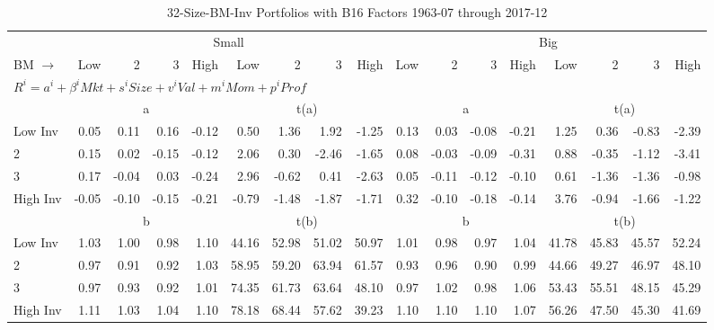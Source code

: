 
\begin{table}[!ht]
\footnotesize
\centering
\caption{32-Size-BM-Inv Portfolios with B16 Factors 1963-07 through 2017-12}
\begin{tabular}{lrrrrrrrrrrrrrrrr}
  \toprule
     & \multicolumn{8}{c}{Small} & \multicolumn{8}{c}{Big}  \\
     \cmidrule(r){2-9} \cmidrule(r){10-17}
    BM $\rightarrow$ & Low & 2 & 3 & High & Low & 2 & 3 & High & Low & 2 & 3 & High & Low & 2 & 3 & High  \\ 
  \midrule
  \multicolumn{17}{l}{$R^i=a^i+\beta^iMkt+s^iSize+v^iVal+m^iMom+p^iProf$}  \\
  
     & \multicolumn{4}{c}{a} & \multicolumn{4}{c}{t(a)}  & \multicolumn{4}{c}{a} & \multicolumn{4}{c}{t(a)}   \\
     \cmidrule(r){2-5} \cmidrule(r){6-9}  \cmidrule(r){10-13} \cmidrule(r){14-17} 
    Low Inv  & 0.05  & 0.11  & 0.16  & -0.12  & 0.50  & 1.36  & 1.92  & -1.25  & 0.13  & 0.03  & -0.08  & -0.21  & 1.25  & 0.36  & -0.83  & -2.39   \\
    2  & 0.15  & 0.02  & -0.15  & -0.12  & 2.06  & 0.30  & -2.46  & -1.65  & 0.08  & -0.03  & -0.09  & -0.31  & 0.88  & -0.35  & -1.12  & -3.41   \\
    3  & 0.17  & -0.04  & 0.03  & -0.24  & 2.96  & -0.62  & 0.41  & -2.63  & 0.05  & -0.11  & -0.12  & -0.10  & 0.61  & -1.36  & -1.36  & -0.98   \\
    High Inv  & -0.05  & -0.10  & -0.15  & -0.21  & -0.79  & -1.48  & -1.87  & -1.71  & 0.32  & -0.10  & -0.18  & -0.14  & 3.76  & -0.94  & -1.66  & -1.22   \\
    
  
     & \multicolumn{4}{c}{b} & \multicolumn{4}{c}{t(b)}  & \multicolumn{4}{c}{b} & \multicolumn{4}{c}{t(b)}   \\
     \cmidrule(r){2-5} \cmidrule(r){6-9}  \cmidrule(r){10-13} \cmidrule(r){14-17} 
    Low Inv  & 1.03  & 1.00  & 0.98  & 1.10  & 44.16  & 52.98  & 51.02  & 50.97  & 1.01  & 0.98  & 0.97  & 1.04  & 41.78  & 45.83  & 45.57  & 52.24   \\
    2  & 0.97  & 0.91  & 0.92  & 1.03  & 58.95  & 59.20  & 63.94  & 61.57  & 0.93  & 0.96  & 0.90  & 0.99  & 44.66  & 49.27  & 46.97  & 48.10   \\
    3  & 0.97  & 0.93  & 0.92  & 1.01  & 74.35  & 61.73  & 63.64  & 48.10  & 0.97  & 1.02  & 0.98  & 1.06  & 53.43  & 55.51  & 48.15  & 45.29   \\
    High Inv  & 1.11  & 1.03  & 1.04  & 1.10  & 78.18  & 68.44  & 57.62  & 39.23  & 1.10  & 1.10  & 1.10  & 1.07  & 56.26  & 47.50  & 45.30  & 41.69   \\
    

\end{tabular}
\end{table}
